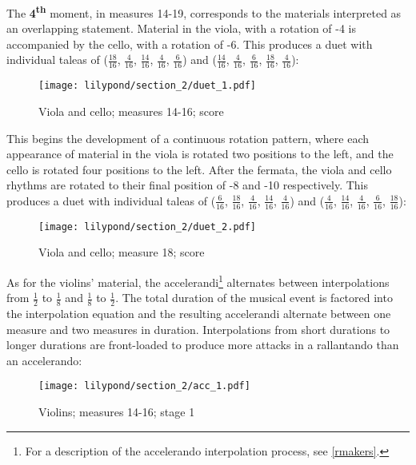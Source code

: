 The \textbf{4\textsuperscript{th}} moment, in measures 14-19, corresponds to the materials  interpreted as an overlapping statement. Material  in the viola, with a rotation of -4 is accompanied by the cello, with a rotation of -6. This produces a duet with individual taleas of ($\frac{18}{16}$, $\frac{4}{16}$, $\frac{14}{16}$, $\frac{4}{16}$, $\frac{6}{16}$) and ($\frac{14}{16}$, $\frac{4}{16}$, $\frac{6}{16}$, $\frac{18}{16}$, $\frac{4}{16}$):

\setcounter{figure}{11}
\setcounter{subFigure}{1}
\renewcommand{\thefigure}{\thechapter.\arabic{figure}}
\begin{figure}[H]
    \texttt{[image: lilypond/section\_2/duet\_1.pdf]}
    \caption{Viola and cello; measures 14-16; score}
    \label{fig:duet-1}
\end{figure}

This begins the development of a continuous rotation pattern, where each appearance of material  in the viola is rotated two positions to the left, and the cello is rotated four positions to the left. After the fermata, the viola and cello rhythms are rotated to their final position of -8 and -10 respectively. This produces a duet with individual taleas of ($\frac{6}{16}$, $\frac{18}{16}$, $\frac{4}{16}$, $\frac{14}{16}$, $\frac{4}{16}$) and ($\frac{4}{16}$, $\frac{14}{16}$, $\frac{4}{16}$, $\frac{6}{16}$, $\frac{18}{16}$):

\setcounter{figure}{12}
\begin{figure}[H]
    \texttt{[image: lilypond/section\_2/duet\_2.pdf]}
    \caption{Viola and cello; measure 18; score}
    \label{fig:duet-2}
\end{figure}

As for the violins'  material, the accelerandi\footnote{For a description of the accelerando interpolation process, see \vref{rmakers}.} alternates between interpolations from $\frac{1}{2}$ to $\frac{1}{8}$ and $\frac{1}{8}$ to $\frac{1}{2}$. The total duration of the musical event is factored into the interpolation equation and the resulting accelerandi alternate between one measure and two measures in duration. Interpolations from short durations to longer durations are front-loaded to produce more attacks in a rallantando than an accelerando:

\setcounter{figure}{13}
\setcounter{subFigure}{1}
\renewcommand{\thefigure}{\thechapter.\arabic{figure}.\alph{subFigure}}
\begin{figure}[H]
    \texttt{[image: lilypond/section\_2/acc\_1.pdf]}
    \caption{Violins; measures 14-16; stage 1}
    \label{fig:accelerando-1}
\end{figure}

